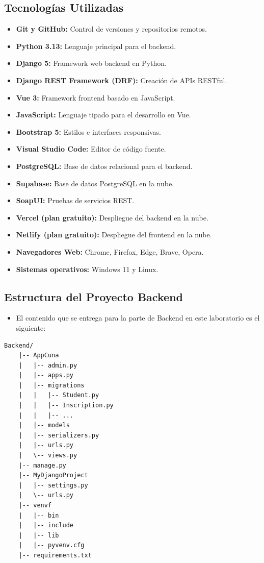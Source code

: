 \documentclass{article}
\begin{document}
    \subsection{Tecnologías Utilizadas}
        \begin{itemize}
            \item \textbf{Git y GitHub:} Control de versiones y repositorios remotos.
            \item \textbf{Python 3.13:} Lenguaje principal para el backend.
            \item \textbf{Django 5:} Framework web backend en Python.
            \item \textbf{Django REST Framework (DRF):} Creación de APIs RESTful.
            \item \textbf{Vue 3:} Framework frontend basado en JavaScript.
            \item \textbf{JavaScript:} Lenguaje tipado para el desarrollo en Vue.
            \item \textbf{Bootstrap 5:} Estilos e interfaces responsivas.
            \item \textbf{Visual Studio Code:} Editor de código fuente.
            \item \textbf{PostgreSQL:} Base de datos relacional para el backend.
            \item \textbf{Supabase:} Base de datos PostgreSQL en la nube.
            \item \textbf{SoapUI:} Pruebas de servicios REST.
            \item \textbf{Vercel (plan gratuito):} Despliegue del backend en la nube.
            \item \textbf{Netlify (plan gratuito):} Despliegue del frontend en la nube.
            \item \textbf{Navegadores Web:} Chrome, Firefox, Edge, Brave, Opera.
            \item \textbf{Sistemas operativos:} Windows 11 y Linux.
        \end{itemize}
    \subsection{Estructura del Proyecto Backend}
    \begin{itemize}	
		\item El contenido que se entrega para la parte de Backend en este laboratorio es el siguiente:
	\end{itemize}
        \begin{lstlisting}[style=ascii-tree, numbers=none]
    Backend/
    |-- AppCuna
    |   |-- admin.py
    |   |-- apps.py
    |   |-- migrations
    |   |   |-- Student.py
    |   |   |-- Inscription.py
    |   |   |-- ...
    |   |-- models
    |   |-- serializers.py
    |   |-- urls.py
    |   \-- views.py
    |-- manage.py
    |-- MyDjangoProject
    |   |-- settings.py
    |   \-- urls.py
    |-- venvf
    |   |-- bin
    |   |-- include
    |   |-- lib
    |   |-- pyvenv.cfg
    |-- requirements.txt
        \end{lstlisting}
\end{document}
